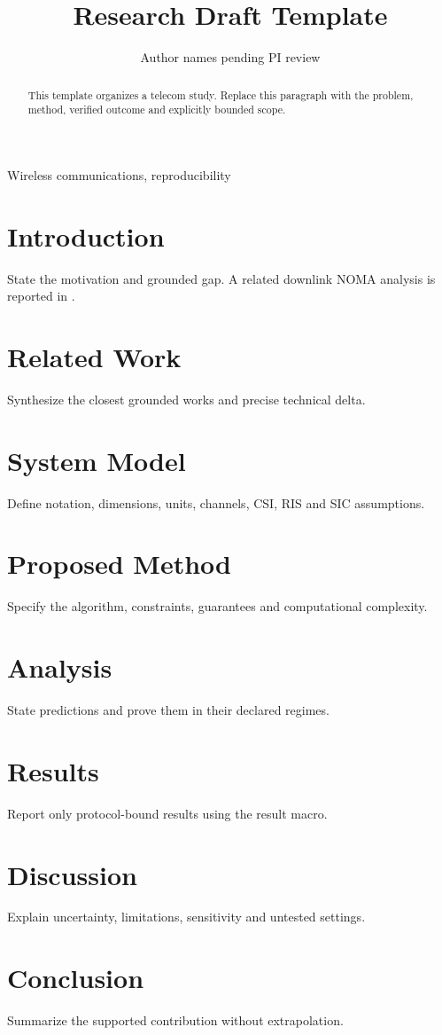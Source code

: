 \documentclass[conference]{IEEEtran}
\title{Research Draft Template}
\author{Author names pending PI review}
\begin{document}
\maketitle
\begin{abstract}
This template organizes a telecom study. Replace this paragraph with the
problem, method, verified outcome and explicitly bounded scope.
\end{abstract}
\begin{IEEEkeywords}Wireless communications, reproducibility\end{IEEEkeywords}
\section{Introduction}
State the motivation and grounded gap. A related downlink NOMA analysis is
reported in \cite{Ding2014}.
\section{Related Work}
Synthesize the closest grounded works and precise technical delta.
\section{System Model}
Define notation, dimensions, units, channels, CSI, RIS and SIC assumptions.
\section{Proposed Method}
Specify the algorithm, constraints, guarantees and computational complexity.
\section{Analysis}
State predictions and prove them in their declared regimes.
\section{Results}
Report only protocol-bound results using the result macro.
\section{Discussion}
Explain uncertainty, limitations, sensitivity and untested settings.
\section{Conclusion}
Summarize the supported contribution without extrapolation.


\end{document}
